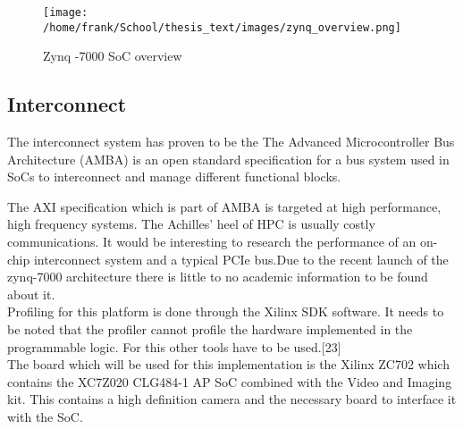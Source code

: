 \begin{figure}[H]
\centering
\texttt{[image: /home/frank/School/thesis\_text/images/zynq\_overview.png]}
\caption{Zynq -7000 SoC overview}
\label{img:zynq_overview}
\end{figure}

	\subsection{Interconnect}
	The interconnect system has proven to be the The Advanced Microcontroller Bus Architecture (AMBA) is an open standard specification for a bus system used in SoCs to interconnect and manage different functional blocks. 


	The AXI specification which is part of AMBA is targeted at high performance, high frequency systems. The Achilles' heel of HPC is usually costly communications. It would be interesting to research the performance of an on-chip interconnect system and a typical PCIe bus.Due to the recent launch of the zynq-7000 architecture there is little to no academic information to be found about it.\\
	Profiling for this platform is done through the Xilinx SDK software. It needs to be noted that the profiler cannot profile the hardware implemented in the programmable logic. For this other tools have to be used.[23]\\
	The board which will be used for this implementation is the Xilinx ZC702 which contains the XC7Z020 CLG484-1 AP SoC combined with the Video and Imaging kit. This contains a high definition camera and the necessary board to interface it with the SoC. 

